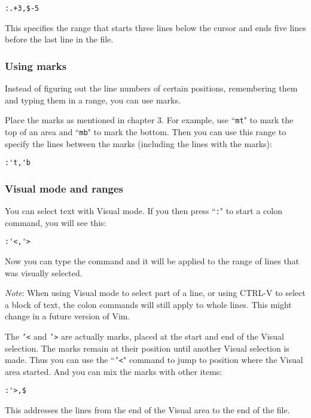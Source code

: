 \begin{Verbatim}[samepage=true]
 :.+3,$-5
\end{Verbatim}

This specifies the range that starts three lines below the cursor and ends five lines before the last line in the file.
\subsubsection{Using marks}
Instead of figuring out the line numbers of certain positions, remembering them and typing them in a range, you can use marks.

Place the marks as mentioned in chapter 3.
For example, use ``\texttt{mt}" to mark the top of an area and ``\texttt{mb}" to mark the bottom.
Then you can use this range to specify the lines between the marks (including the lines with the marks):

\begin{Verbatim}[samepage=true]
 :'t,'b
\end{Verbatim}
\subsubsection{Visual mode and ranges}
You can select text with Visual mode.
If you then press ``\texttt{:}" to start a colon command, you will see this:

\begin{Verbatim}[samepage=true]
 :'<,'>
\end{Verbatim}

Now you can type the command and it will be applied to the range of lines that was visually selected.

\emph{Note}:
When using Visual mode to select part of a line, or using CTRL-V to select a block of text, the colon commands will still apply to whole lines.
This might change in a future version of Vim.

The \texttt{'<} and \texttt{'>} are actually marks, placed at the start and end of the Visual selection.
The marks remain at their position until another Visual selection is made.
Thus you can use the ``\texttt{'<}" command to jump to position where the Visual area started.
And you can mix the marks with other items:

\begin{Verbatim}[samepage=true]
 :'>,$
\end{Verbatim}

This addresses the lines from the end of the Visual area to the end of the file.
